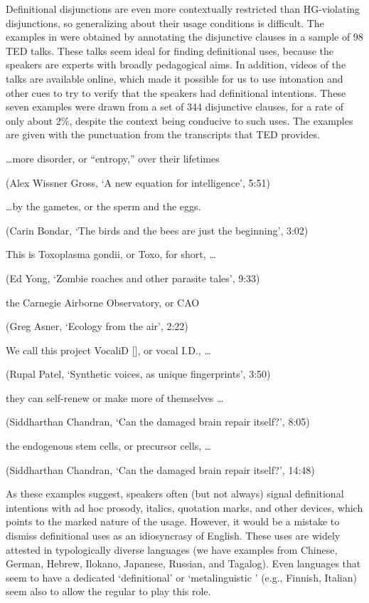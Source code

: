 \documentclass[12pt,twoside]{article}
\renewcommand{\_}{\textbf{\textunderscore\hspace{-4pt}\textunderscore\hspace{-3pt}\textunderscore\hspace{-4pt}\textunderscore}\hspace{0.5pt}}			%
\begin{document}
Definitional disjunctions are even more contextually restricted than
HG-violating disjunctions, so generalizing about their usage
conditions is difficult.  The examples in  were obtained by
annotating the disjunctive clauses in a sample of 98 TED talks. These
talks seem ideal for finding definitional uses, because the speakers
are experts with broadly pedagogical aims. In addition, videos of the
talks are available online, which made it possible for us to use
intonation and other cues to try to verify that the speakers had
definitional intentions. These seven examples were drawn from a set of
344 disjunctive clauses, for a rate of only about 2\%, despite the
context being conducive to such uses. The examples are given with the
punctuation from the transcripts that TED provides.
%
\begin{exe}
  \ex\label{ted}
  \begin{xlist}
    \ex \ldots more disorder, or ``entropy,'' over their lifetimes 
    
    (Alex Wissner Gross, `A new equation for intelligence', 5:51)

    \ex \ldots by the gametes, or the sperm and the eggs.

    (Carin Bondar, `The birds and the bees are just the beginning', 3:02)

    \ex This is Toxoplasma gondii, or Toxo, for short, \ldots

    (Ed Yong, `Zombie roaches and other parasite tales', 9:33)

    \ex the Carnegie Airborne Observatory, or CAO

    (Greg Asner, `Ecology from the air', 2:22)

    \ex We call this project VocaliD [], or vocal I.D., \ldots

    (Rupal Patel, `Synthetic voices, as unique fingerprints', 3:50)

    \ex they can self-renew or make more of themselves \ldots

    (Siddharthan Chandran, `Can the damaged brain repair itself?', 8:05)

    \ex the endogenous stem cells, or precursor cells, \ldots

    (Siddharthan Chandran, `Can the damaged brain repair itself?', 14:48)
  \end{xlist}
\end{exe}

As these examples suggest, speakers often (but not always) signal
definitional intentions with ad hoc prosody, italics, quotation marks,
and other devices, which points to the marked nature of the
usage. However, it would be a mistake to dismiss definitional uses as
an idiosyncrasy of English. These uses are widely attested in
typologically diverse languages (we have examples from Chinese,
German, Hebrew, Ilokano, Japanese, Russian, and Tagalog). Even
languages that seem to have a dedicated `definitional' or
`metalinguistic ' (e.g., Finnish, Italian) seem also to allow
the regular  to play this role.
\end{document}
